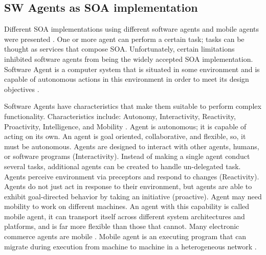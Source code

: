 \documentclass[12pt,a4paper,final,twoside,onecolumn,titlepage]{book}
\begin{document}
\subsection{SW Agents as SOA implementation}
Different \gls{SOA} implementations using different software agents and mobile agents were presented \cite{BS13, BS32, BS33, BS34, R43}. One or more agent can perform a certain task; tasks can be thought as services that compose \gls{SOA}. Unfortunately, certain limitations inhibited software agents from being the widely accepted \gls{SOA} implementation. Software Agent is a computer system that is situated in some environment and is capable of autonomous actions in this environment in order to meet its design objectives \cite{BS36, BS37}. 

Software Agents have characteristics that make them suitable to perform complex functionality. Characteristics include: Autonomy, Interactivity, Reactivity, Proactivity, Intelligence, and Mobility \cite{MNAS02}. Agent is autonomous; it is capable of acting on its own. An agent is goal oriented, collaborative, and flexible, so, it must be autonomous. Agents are designed to interact with other agents, humans, or software programs (Interactivity). Instead of making a single agent conduct several tasks, additional agents can be created to handle un-delegated task. Agents perceive environment via preceptors \cite{BS39} and respond to changes (Reactivity). Agents do not just act in response to their environment, but agents are able to exhibit goal-directed behavior by taking an initiative (proactive). Agent may need mobility to work on different machines. An agent with this capability is called mobile agent, it can transport itself across different system architectures and platforms, and is far more flexible than those that cannot. Many electronic commerce agents are mobile \cite{MNAS02,BS40}. Mobile agent is an executing program that can migrate during execution from machine to machine in a heterogeneous network \cite{BS37}.
\end{document}
